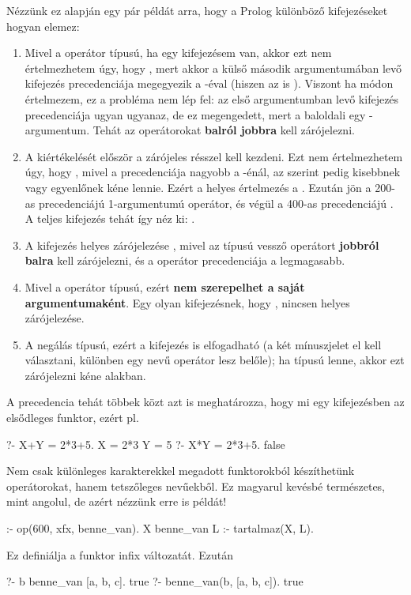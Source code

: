 Nézzünk ez alapján egy pár példát arra, hogy a
Prolog különböző kifejezéseket hogyan elemez:
\begin{enumerate}
\item Mivel a \pr{+} operátor  típusú, ha
  egy  kifejezésem van, akkor ezt nem
  értelmezhetem úgy, hogy , mert
  akkor a külső \pr{+} második argumentumában levő
   kifejezés precedenciája megegyezik a
  \pr{+}-éval (hiszen az is \pr{+}). Viszont ha
   módon értelmezem, ez a probléma
  nem lép fel: az első argumentumban levő  kifejezés precedenciája ugyan ugyanaz, de ez
  megengedett, mert a baloldali egy
  -argumentum. Tehát az  operátorokat
  {\bf balról jobbra} kell zárójelezni.
\item A  kiértékelését először
  a zárójeles résszel kell kezdeni. Ezt nem
  értelmezhetem úgy, hogy , mivel
  a \pr{+} precedenciája nagyobb a \pr{*}-énál, az
   szerint pedig kisebbnek vagy egyenlőnek
  kéne lennie. Ezért a helyes értelmezés a . Ezután jön a 200-as precedenciájú
  1-argumentumú \pr{-} operátor, és végül a 400-as
  precedenciájú \pr{*}. A teljes kifejezés tehát így
  néz ki: .
\item A  kifejezés helyes
  zárójelezése , mivel
  az  típusú vessző operátort {\bf jobbról
  balra} kell zárójelezni, és a \pr{:-} operátor
  precedenciája a legmagasabb.
\item Mivel a \pr{:-} operátor  típusú,
  ezért {\bf nem szerepelhet a saját
  argumentumaként}. Egy olyan kifejezésnek, hogy
  , nincsen helyes zárójelezése.
\item A negálás  típusú, ezért a 
  kifejezés is elfogadható (a két mínuszjelet el
  kell választani, különben egy \pr{--} nevű
  operátor lesz belőle); ha  típusú lenne,
  akkor ezt zárójelezni kéne  alakban.
\end{enumerate}
A precedencia tehát többek közt azt is meghatározza,
hogy mi egy kifejezésben az elsődleges funktor,
ezért pl.
\begin{query}
?- X+Y = 2*3+5.
X = 2*3
Y = 5
?- X*Y = 2*3+5.
false
\end{query}

Nem csak különleges karakterekkel megadott
funktorokból készíthetünk operátorokat, hanem
tetszőleges nevűekből. Ez magyarul kevésbé
természetes, mint angolul, de azért nézzünk erre is
példát!
\begin{query}
:- op(600, xfx, benne_van).
X benne_van L :- tartalmaz(X, L).
\end{query}
Ez definiálja a  funktor infix
változatát. Ezután
\begin{query}
?- b benne_van [a, b, c].
true
?- benne_van(b, [a, b, c]).
true
\end{query}

